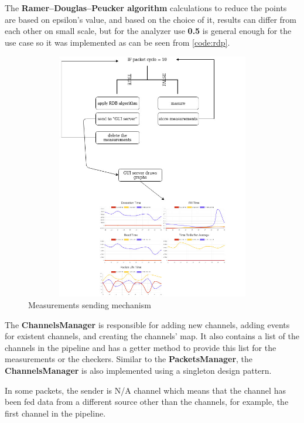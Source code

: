 The \textbf{Ramer–Douglas–Peucker algorithm} calculations to reduce the points are based on epsilon's value,
and based on the choice of it, results can differ from each other on small scale, but for the analyzer use
\textbf{0.5} is general enough for the use case so it was implemented as can be seen from \ref{code:rdp}.
\newline
\begin{figure}[H]
	\centering
	\includegraphics[width=1.0\textwidth,height=410px]{images/measurement_sending_cycle.jpg}
	\caption{Measurements sending mechanism}
	\label{fig:measurement cycle}
\end{figure}

The \textbf{ChannelsManager} is responsible for adding new channels, adding events for existent channels,
and creating the channels' map. It also contains a list of the channels in the pipeline 
and has a getter method to provide this list for the measurements or the checkers. Similar to the 
\textbf{PacketsManager}, the \textbf{ChannelsManager} is also implemented using a singleton design pattern.

In some packets, the sender is N/A channel which means that the channel has been fed data from a different
source other than the channels, for example, the first channel in the pipeline.

